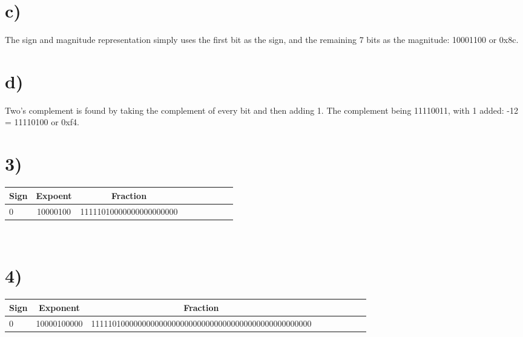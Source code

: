 \documentclass[a4paper,11pt]{article}
\begin{document}
\section*{c)} 
The sign and magnitude representation simply uses the first bit as the sign, and the remaining 7 bits as the magnitude: 10001100 or 0x8c.

\section*{d)} 
Two's complement is found by taking the complement of every bit and then adding 1.  The complement being 11110011, with 1 added: -12 = 11110100 or 0xf4.


\section*{3)}
\begin{tabular}{| l | c | c | c | c | c | c | c | c |}
  \hline	
   Sign & Expoent & Fraction \\  \hline  		
   0 & 10000100 & 11111010000000000000000  \\ \hline
\end{tabular} \\


\section*{4)}
\begin{tabular}{| l | c | c | c | c | c | c | c | c |}
  \hline	
   Sign & Exponent & Fraction \\  \hline  		
   0 & 10000100000 & 1111101000000000000000000000000000000000000000000000  \\ \hline
\end{tabular} \\

\end{document}
